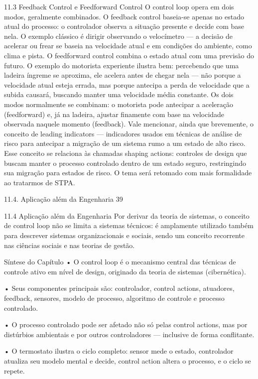 11.3 Feedback Control e Feedforward Control O control loop opera em dois modos, geralmente combinados. O feedback control baseia-se apenas no estado atual do processo: o controlador observa a situação presente e decide com base nela. O exemplo clássico é dirigir observando o velocímetro — a decisão de acelerar ou frear se baseia na velocidade atual e em condições do ambiente, como clima e pista. O feedforward control combina o estado atual com uma previsão do futuro. O exemplo do motorista experiente ilustra bem: percebendo que uma ladeira íngreme se aproxima, ele acelera antes de chegar nela — não porque a velocidade atual esteja errada, mas porque antecipa a perda de velocidade que a subida causará, buscando manter uma velocidade média constante. Os dois modos normalmente se combinam: o motorista pode antecipar a aceleração (feedforward) e, já na ladeira, ajustar finamente com base na velocidade observada naquele momento (feedback). Vale mencionar, ainda que brevemente, o conceito de leading indicators — indicadores usados em técnicas de análise de risco para antecipar a migração de um sistema rumo a um estado de alto risco. Esse conceito se relaciona às chamadas shaping actions: controles de design que buscam manter o processo controlado dentro de um estado seguro, restringindo sua migração para estados de risco. O tema será retomado com mais formalidade ao tratarmos de STPA.

11.4. Aplicação além da Engenharia 39

11.4 Aplicação além da Engenharia Por derivar da teoria de sistemas, o conceito de control loop não se limita a sistemas técnicos: é amplamente utilizado também para descrever sistemas organizacionais e sociais, sendo um conceito recorrente nas ciências sociais e nas teorias de gestão.

Síntese do Capítulo • O control loop é o mecanismo central das técnicas de controle ativo em nível de design, originado da teoria de sistemas (cibernética).

• Seus componentes principais são: controlador, control actions, atuadores, feedback, sensores, modelo de processo, algoritmo de controle e processo controlado.

• O processo controlado pode ser afetado não só pelas control actions, mas por distúrbios ambientais e por outros controladores — inclusive de forma conflitante.

• O termostato ilustra o ciclo completo: sensor mede o estado, controlador atualiza seu modelo mental e decide, control action altera o processo, e o ciclo se repete.

